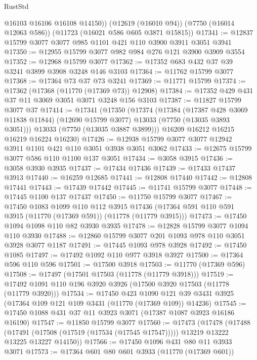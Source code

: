 \begin{lexlean}{RustStd}
\begin{coremodule}
        @16103
        @16106
        @16108
        @14150))
    (@12619 (@16010 @94))
    (@7750 (@16014 @12063 @586))
    (@11723 (@16021 @586 @605 @3871 @15815))
@17341 := @12837 @15799 @3077 @3077 @985 @1101 @421 @110 @3900 @3911 @3051 @3941
@17350 := @12955 @15799 @3077 @982 @984 @276 @121 @3900 @3909 @3554
@17352 := @12968 @15799 @3077
@17362 := @17352 @683 @432 @37 @39 @3241 @3899 @3908 @3248 @146 @3103
@17364 := @11762 @15799 @3077
@17368 := @17364 @73 @37 @73 @3241
@17369 := @11771 @15799
@17374 := @17362 (@17368 (@11770 (@17369 @73)) @12908)
@17384 := @17352 @429 @431 @37 @11 @3069 @3051 @3071 @3248 @156 @3103
@17387 := @11827 @15799 @3077 @37
@17414 := @17341
    (@17350
      (@17374
        (@17384
          (@17387 @428 @3069 @11838 @11844)
          (@12690 @15799 @3077)
          @13033
          (@7750 (@13035 @3893 @3051)))
        @13033
        (@7750 (@13035 @3887 @3899)))
      @16209
      @16212
      @16215
      @16219
      @16224
      @16230)
@17426 := @12938 @15799 @3077 @3077 @12942 @3911 @1101 @421 @110 @3051 @3938 @3051 @3062
@17433 := @12675 @15799 @3077 @586 @110 @1100 @137 @3051
@17434 := @3058 @3915
@17436 := @3058 @3930 @3935
@17437 := @17434 @17436
@17439 := @17433 @17437 @3913
@17440 := @16259 @12685
@17441 := @12808 @17440
@17442 := @12808 @17441
@17443 := @17439 @17442
@17445 := @11741 @15799 @3077
@17448 := @17445 @1100 @137 @17437
@17450 := @11750 @15799 @3077
@17467 := @17450
    @1083
    @1099
    @110
    @112
    @3915
    @17436
    (@17364 @591 @110 @591 @3915 (@11770 (@17369 @591)) (@11778 (@11779 @3915)))
@17473 := @17450 @1094 @1098 @110 @82 @3930 @3935
@17478 := @12828 @15799 @3077 @1094 @110 @3930
@17488 := @12860 @15799 @3077 @201 @1093 @978 @110 @3051 @3928 @3077 @1187
@17491 := @17445 @1093 @978 @3928
@17492 := @17450 @1085
@17497 := @17492 @1092 @110 @977 @3918 @3927
@17500 := @17364 @596 @110 @596
@17501 := @17500 @3918
@17503 := @11770 (@17369 @596)
@17508 := @17497 (@17501 @17503 (@11778 (@11779 @3918)))
@17519 := @17492 @1091 @110 @196 @3920 @3926 (@17500 @3920 @17503 (@11778 (@11779 @3920)))
@17534 := @17450
    @423
    @1090
    @121
    @39
    @3431
    @3925
    (@17364 @109 @121 @109 @3431 (@11770 (@17369 @109)) @14236)
@17545 := @17450 @1088 @431 @37 @11 @3923 @3071 (@17387 @1087 @3923 @16186 @16190)
@17547 := @11850 @15799 @3077
@17560 := @17473
    (@17478
      (@17488
        (@17491 (@17508 (@17519 (@17534 (@17545 @17547)))))
        @13219
        @13222
        @13225
        @13227
        @14150))
@17566 := @17450 @1096 @431 @80 @11 @3933 @3071
@17573 := @17364 @601 @80 @601 @3933 (@11770 (@17369 @601))

\end{coremodule}
\end{lexlean}
